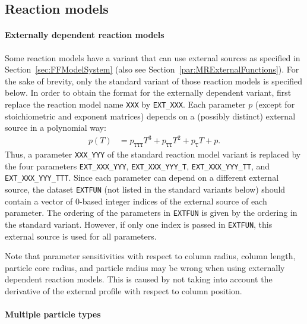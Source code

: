 \subsection{Reaction models}\label{sec:FFReaction}

\paragraph{Externally dependent reaction models}

Some reaction models have a variant that can use external sources as specified in Section~\ref{sec:FFModelSystem} (also see Section~\ref{par:MRExternalFunctions}).
For the sake of brevity, only the standard variant of those reaction models is specified below.
In order to obtain the format for the externally dependent variant, first replace the reaction model name \texttt{XXX} by \texttt{EXT\_XXX}.
Each parameter $p$ (except for stoichiometric and exponent matrices) depends on a (possibly distinct) external source in a polynomial way:
\begin{align*}
  p(T) &= p_{\texttt{TTT}} T^3 + p_{\texttt{TT}} T^2 + p_{\texttt{T}} T + p.
\end{align*}
Thus, a parameter \texttt{XXX\_YYY} of the standard reaction model variant is replaced by the four parameters \texttt{EXT\_XXX\_YYY}, \texttt{EXT\_XXX\_YYY\_T}, \texttt{EXT\_XXX\_YYY\_TT}, and \texttt{EXT\_XXX\_YYY\_TTT}.
Since each parameter can depend on a different external source, the dataset \texttt{EXTFUN} (not listed in the standard variants below) should contain a vector of 0-based integer indices of the external source of each parameter.
The ordering of the parameters in \texttt{EXTFUN} is given by the ordering in the standard variant.
However, if only one index is passed in \texttt{EXTFUN}, this external source is used for all parameters.

Note that parameter sensitivities with respect to column radius, column length, particle core radius, and particle radius may be wrong when using externally dependent reaction models.
This is caused by not taking into account the derivative of the external profile with respect to column position.

\paragraph{Multiple particle types}

